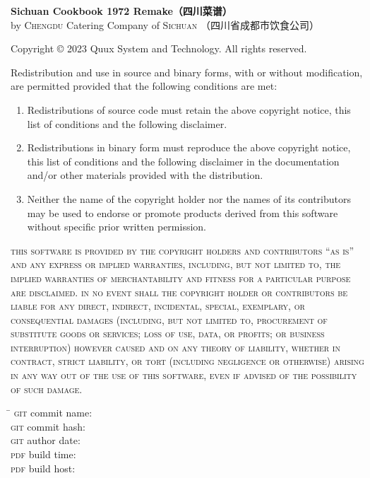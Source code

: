 \begingroup%
\footnotesize%
\singlespacing%
\setlength{\parindent}{0pt}%
\setlength{\parskip}{.166666\baselineskip}%
{\sffamily\bfseries Sichuan Cookbook 1972 Remake\!（四川菜谱）}\\
by \textsc{Chengdu} Catering Company of \textsc{Sichuan}\!%
（四川省成都市饮食公司）

\null

Copyright {\copyright} 2023 Quux System and Technology. All rights reserved.

Redistribution and use in source and binary forms, with or without
modification, are permitted provided that the following conditions are met:

\begin{enumerate}
\item Redistributions of source code must retain the above copyright notice,
      this list of conditions and the following disclaimer.

\item Redistributions in binary form must reproduce the above copyright notice,
      this list of conditions and the following disclaimer in the documentation
      and/or other materials provided with the distribution.

\item Neither the name of the copyright holder nor the names of its
      contributors may be used to endorse or promote products derived from
      this software without specific prior written permission.
\end{enumerate}

\textsc{this software is provided by the copyright holders and contributors
``as is'' and any express or implied warranties, including, but not limited to,
the implied warranties of merchantability and fitness for a particular purpose
are disclaimed. in no event shall the copyright holder or contributors be
liable for any direct, indirect, incidental, special, exemplary, or
consequential damages (including, but not limited to, procurement of
substitute goods or services; loss of use, data, or profits; or business
interruption) however caused and on any theory of liability, whether in
contract, strict liability, or tort (including negligence or otherwise)
arising in any way out of the use of this software, even if advised of the
possibility of such damage.}

\vfill

\setlength{\parskip}{.333333\baselineskip}%
\begin{tabbing}
\hspace{8.75em}\= \kill
\textsc{git} commit name: \>\texttt{\gitcommitname}\\
\textsc{git} commit hash: \>\texttt{\gitcommithash}\\
\textsc{git} author date: \>\texttt{\gitauthordate}\\
\textsc{pdf} build time:  \>\texttt{\pdfbuildtime}\\
\textsc{pdf} build host:  \>\texttt{\pdfbuildhost}
\end{tabbing}
\vspace{-1\baselineskip}

